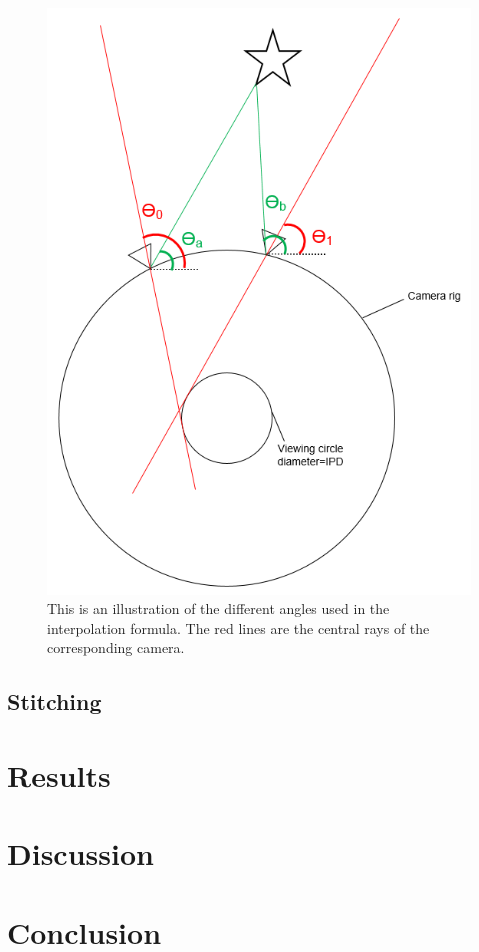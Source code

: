 \documentclass[10pt,twocolumn,letterpaper]{article}
\begin{document}
\begin{figure}[t]
\begin{center}
   \includegraphics[width=0.7\linewidth]{pictures/interpolation.png}
\end{center}
   \caption{This is an illustration of the different angles used in the interpolation formula. The red lines are the central rays of the corresponding camera.}
\label{fig:long}
\label{fig:onecol}
\end{figure}

\subsection{Stitching}



\section{Results}


\section{Discussion}


\section{Conclusion}







{\small


}
\end{document}
